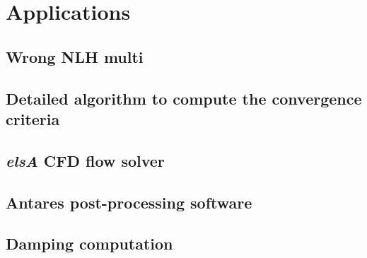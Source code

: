 \documentclass[a4paper, twoside, 11pt]{book}
\begin{document}
\part{Applications}
\label{part3}








\appendix
\chapter{Wrong NLH multi}


\chapter{Detailed algorithm to compute the convergence criteria}


\chapter{\emph{elsA} CFD flow solver}


\chapter{Antares post-processing software}



\chapter{Damping computation}



\backmatter


\label{Bibliography}




\end{document}
